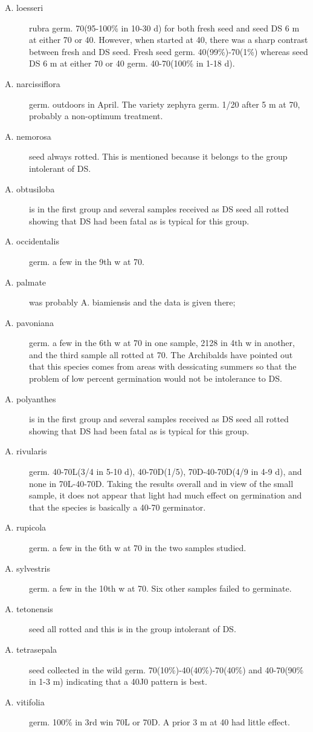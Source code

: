 \begin{description}
\item[A. loesseri] rubra germ. 70(95-100\% in 10-30 d) for both fresh seed and seed
DS 6 m at either 70 or 40. However, when started at 40, there was a sharp contrast
between fresh and DS seed. Fresh seed germ. 40(99\%)-70(1\%) whereas seed DS 6
m at either 70 or 40 germ. 40-70(100\% in 1-18 d).
\item[A. narcissiflora] germ. outdoors in April. The variety zephyra germ. 1/20 after 5 m
at 70, probably a non-optimum treatment.
\item[A. nemorosa] seed always rotted. This is mentioned because it belongs to the
group intolerant of DS.
\item[A. obtusiloba] is in the first group and several samples received as DS seed all
rotted showing that DS had been fatal as is typical for this group.
\item[A. occidentalis] germ. a few in the 9th w at 70.
\item[A. palmate] was probably A. biamiensis and the data is given there;
\item[A. pavoniana] germ. a few in the 6th w at 70 in one sample, 2128 in 4th w in
another, and the third sample all rotted at 70. The Archibalds have pointed out that
this species comes from areas with dessicating summers so that the problem of low
percent germination would not be intolerance to DS.
\item[A. polyanthes] is in the first group and several samples received as DS seed all
rotted showing that DS had been fatal as is typical for this group.
\item[A. rivularis] germ. 40-70L(3/4 in 5-10 d), 40-70D(1/5), 70D-40-70D(4/9 in 4-9 d),
and none in 70L-40-70D. Taking the results overall and in view of the small sample, it
does not appear that light had much effect on germination and that the species is
basically a 40-70 germinator.
\item[A. rupicola] germ. a few in the 6th w at 70 in the two samples studied.
\item[A. sylvestris] germ. a few in the 10th w at 70. Six other samples failed to
germinate.
\item[A. tetonensis] seed all rotted and this is in the group intolerant of DS.
\item[A. tetrasepala] seed collected in the wild germ. 70(10\%)-40(40\%)-70(40\%) and
40-70(90\% in 1-3 m) indicating that a 40J0 pattern is best.
\item[A. vitifolia] germ. 100\% in 3rd win 70L or 70D. A prior 3 m at 40 had little effect.


\end{description}
